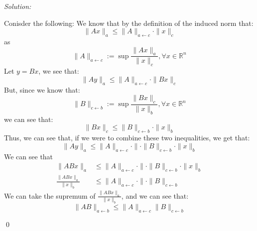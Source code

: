 \documentclass[12pt]{article}
\newenvironment{problem}[2][Problem]{\begin{trivlist}
\item[\hskip \labelsep {\bfseries #1}\hskip \labelsep {\bfseries #2.}]}{\end{trivlist}}
\newenvironment{sol}
    {\emph{Solution:}
    }
    {
    \qed
    }
\newcommand{\R}{\mathbb{R}}
\begin{document}
\begin{sol}
    Conisder the following: We know that by the definition of the induced norm that:
    \[
    \|Ax\|_a \leq \| A\|_{a \leftarrow c} \cdot \|x\|_c
    \]
    as 
    \[
    \|A\|_{a \leftarrow c} := \sup \frac{\|Ax\|_a}{\|x\|_c}, \forall x \in \R^n
    \]
    Let $y = Bx$, we see that:
    \[
    \|Ay\|_a \leq \|A\|_{a\leftarrow c} \cdot  \|Bx\|_c
    \]
    But, since we know that:
    \[
    \|B\|_{c \leftarrow b} := \sup \frac{\|Bx\|_c}{\|x\|_b}, \forall x \in \R^n
    \]
    we can see that:
    \[
        \|Bx\|_c \leq \| B\|_{c \leftarrow b} \cdot \|x\|_b
    \]
    Thus, we can see that, if we were to combine these two inequalities, we get that:
    \[
        \|Ay\|_{a} \leq \|A\|_{a\leftarrow c} \cdot \|\cdot \| B\|_{c \leftarrow b} \cdot \|x\|_b
    \]
    We can see that 
    \begin{align*}
        \|ABx\|_{a} & \leq \|A\|_{a\leftarrow c} \cdot \|\cdot \| B\|_{c \leftarrow b} \cdot \|x\|_b\\
        \frac{\|ABx\|_{a}}{\|x\|_b} & \leq \|A\|_{a\leftarrow c} \cdot \|\cdot \| B\|_{c \leftarrow b}
    \end{align*}
    We can take the supremum of $\frac{\|ABx\|_{a}}{\|x\|_b}$, and we can see that:
    \[
    \|AB\|_{a \leftarrow b} \leq \|A\|_{a \leftarrow c} \|B\|_{c \leftarrow b}
    \]
\end{sol}
\newpage
\begin{problem}{5}
    
\end{problem}
\end{document}
